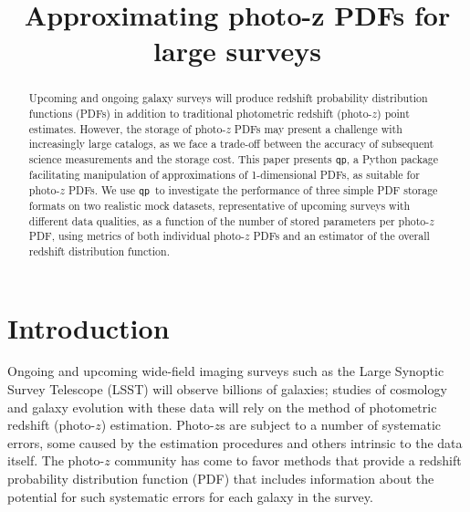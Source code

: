 \documentclass[\docopts]{\docclass}
\newcommand{\qp}{\texttt{qp}}
\newcommand{\pz}{photo-$z$ PDF}
\begin{document}
\title{ Approximating photo-z PDFs for large surveys }


\begin{abstract}

Upcoming and ongoing galaxy surveys will produce redshift probability 
distribution functions (PDFs) in addition to traditional photometric redshift 
(photo-$z$) point estimates.
However, the storage of \pz s may present a challenge with increasingly large 
catalogs, as we face a trade-off between the accuracy of subsequent science 
measurements and the storage cost.
This paper presents \qp, a Python package facilitating manipulation of 
approximations of 1-dimensional PDFs, as suitable for \pz s.
We use \qp\ to investigate the performance of three simple PDF storage formats 
on two realistic mock datasets, representative of upcoming surveys with 
different data qualities, as a function of the number of stored parameters per 
\pz, using metrics of both individual \pz s and an estimator of the overall 
redshift distribution function.

\end{abstract}


\maketitlepost





\section{Introduction}
\label{sec:intro}


Ongoing and upcoming wide-field imaging surveys such as the Large Synoptic 
Survey Telescope (LSST) will observe billions of galaxies; studies of cosmology 
and galaxy evolution with these data will rely on the method of photometric 
redshift (photo-$z$) estimation.
Photo-$z$s are subject to a number of systematic errors, some caused by the 
estimation procedures and others intrinsic to the data itself.
The photo-$z$ community has come to favor methods that provide a redshift 
probability distribution function (PDF) that includes information about the 
potential for such systematic errors for each galaxy in the survey.
\end{document}
